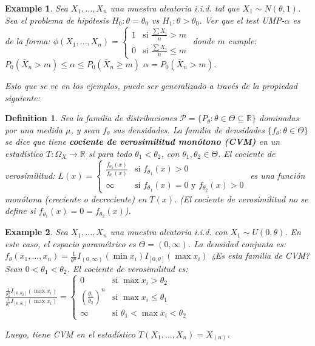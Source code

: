 \documentclass{article}
\theoremstyle{remarkstyle}
\theoremstyle{examplestyle}
\newtheorem*{example}{Example}
\theoremstyle{definitionstyle}
\newtheorem*{definition}{Definition}
\theoremstyle{lemmastyle}
\theoremstyle{theoremstyle}
\begin{document}
\begin{example}
Sea $X_1, \dots, X_n$ una muestra aleatoria i.i.d. tal que $X_1 \sim N(\theta, 1)$.
Sea el problema de hipótesis $H_0: \theta = \theta_0$ vs $H_1: \theta > \theta_0$.
Ver que el test UMP-$\alpha$ es de la forma:
$\phi(X_1, \dots, X_n) = \begin{cases} 1 & \text{si } \frac{\sum X_i}{n} > m \\ 0 & \text{si } \frac{\sum X_i}{n} \le m \end{cases}$
donde $m$ cumple:
$P_0(\bar{X}_n > m) \le \alpha \le P_0(\bar{X}_n \ge m)$
$\alpha = P_0(\bar{X}_n > m)$.

Esto que se ve en los ejemplos, puede ser generalizado a través de la propiedad siguiente:
\end{example}

\begin{definition}
Sea la familia de distribuciones $\mathcal{P} = \{P_\theta : \theta \in \Theta \subseteq \mathbb{R}\}$ dominadas por una medida $\mu$, y sean $f_\theta$ sus densidades.
La familia de densidades $\{f_\theta : \theta \in \Theta\}$ se dice que tiene \textbf{cociente de verosimilitud monótono (CVM)} en un estadístico $T: \Omega_X \to \mathbb{R}$ si para todo $\theta_1 < \theta_2$, con $\theta_1, \theta_2 \in \Theta$. El cociente de verosimilitud:
$L(x) = \begin{cases} \frac{f_{\theta_2}(x)}{f_{\theta_1}(x)} & \text{si } f_{\theta_1}(x) > 0 \\ \infty & \text{si } f_{\theta_1}(x) = 0 \text{ y } f_{\theta_2}(x) > 0 \end{cases}$
es una función monótona (creciente o decreciente) en $T(x)$.
(El cociente de verosimilitud no se define si $f_{\theta_1}(x) = 0 = f_{\theta_2}(x)$).
\end{definition}

\begin{example}
Sea $X_1, \dots, X_n$ una muestra aleatoria i.i.d. con $X_1 \sim U(0, \theta)$.
En este caso, el espacio paramétrico es $\Theta = (0, \infty)$.
La densidad conjunta es:
$f_\theta(x_1, \dots, x_n) = \frac{1}{\theta^n} I_{(0, \infty)}(\min x_i) I_{[0, \theta]}(\max x_i)$
¿Es esta familia de CVM?
Sean $0 < \theta_1 < \theta_2$. El cociente de verosimilitud es:
$\frac{\frac{1}{\theta_2^n} I_{[0, \theta_2]}(\max x_i)}{\frac{1}{\theta_1^n} I_{[0, \theta_1]}(\max x_i)} = \begin{cases} 0 & \text{si } \max x_i > \theta_2 \\ (\frac{\theta_1}{\theta_2})^n & \text{si } \max x_i \le \theta_1 \\ \infty & \text{si } \theta_1 < \max x_i < \theta_2 \end{cases}$

Luego, tiene CVM en el estadístico $T(X_1, \dots, X_n) = X_{(n)}$.
\end{example}
\end{document}
